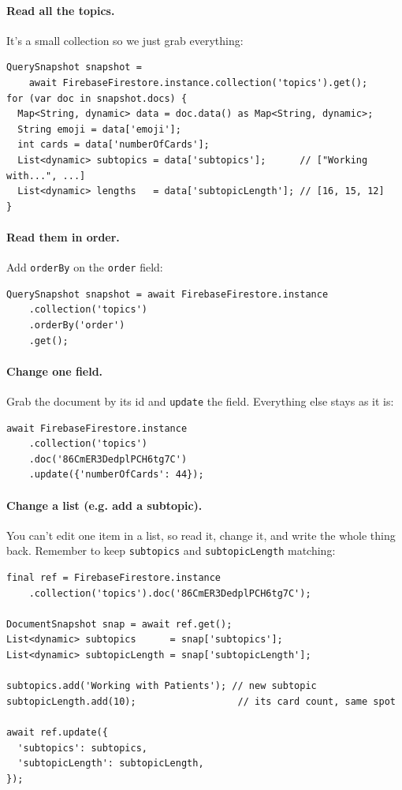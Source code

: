 \documentclass[11pt,a4paper]{article}
\begin{document}
\paragraph{Read all the topics.} It's a small collection so we just grab
everything:

\begin{lstlisting}
QuerySnapshot snapshot =
    await FirebaseFirestore.instance.collection('topics').get();
for (var doc in snapshot.docs) {
  Map<String, dynamic> data = doc.data() as Map<String, dynamic>;
  String emoji = data['emoji'];
  int cards = data['numberOfCards'];
  List<dynamic> subtopics = data['subtopics'];      // ["Working with...", ...]
  List<dynamic> lengths   = data['subtopicLength']; // [16, 15, 12]
}
\end{lstlisting}

\paragraph{Read them in order.} Add \verb|orderBy| on the \texttt{order} field:

\begin{lstlisting}
QuerySnapshot snapshot = await FirebaseFirestore.instance
    .collection('topics')
    .orderBy('order')
    .get();
\end{lstlisting}

\paragraph{Change one field.} Grab the document by its id and \verb|update| the
field. Everything else stays as it is:

\begin{lstlisting}
await FirebaseFirestore.instance
    .collection('topics')
    .doc('86CmER3DedplPCH6tg7C')
    .update({'numberOfCards': 44});
\end{lstlisting}

\paragraph{Change a list (e.g. add a subtopic).} You can't edit one item in a
list, so read it, change it, and write the whole thing back. Remember to keep
\texttt{subtopics} and \texttt{subtopicLength} matching:

\begin{lstlisting}
final ref = FirebaseFirestore.instance
    .collection('topics').doc('86CmER3DedplPCH6tg7C');

DocumentSnapshot snap = await ref.get();
List<dynamic> subtopics      = snap['subtopics'];
List<dynamic> subtopicLength = snap['subtopicLength'];

subtopics.add('Working with Patients'); // new subtopic
subtopicLength.add(10);                  // its card count, same spot

await ref.update({
  'subtopics': subtopics,
  'subtopicLength': subtopicLength,
});
\end{lstlisting}
\end{document}
